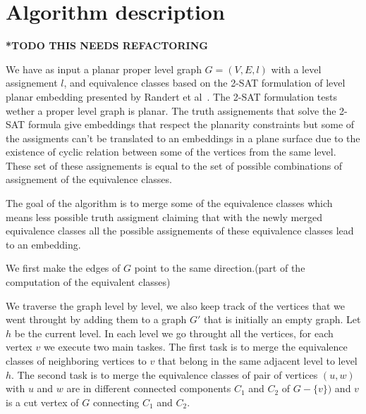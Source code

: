 \section{Algorithm description}%
\label{sub:Algorithm description}
    \textbf{*TODO THIS NEEDS REFACTORING} 


    We have as input a planar proper level graph $G=\left( V,E,l \right) $ with a level assignement
    $l$, and equivalence classes based on the 2-SAT formulation of level planar embedding presented by 
    Randert et al~\cite{randerath2001satisfiability}. The 2-SAT formulation tests wether a proper level graph 
    is planar. The truth assignements that solve the 2-SAT formula give embeddings that respect the planarity constraints 
    but some of the assigments can't be translated to an embeddings in a plane surface due to the existence of cyclic relation between some of the vertices from the same level. 
    These set of these assignements is equal to the set of possible combinations of assignement of the equivalence classes.

    The goal of the algorithm is to merge some of the equivalence classes which means less possible truth assigment claiming that with the newly merged equivalence classes 
    all the possible assignements of these equivalence classes lead to an embedding. 

    We first make the edges of $G$ point to the same direction.(part of the computation of the equivalent classes)

    We traverse the graph level by level, we also keep track of the vertices that we went throught by adding them to a graph $G'$ that is initially an empty graph. 
    Let $h$ be the current level. In each level we go throught all the vertices, for each vertex $v$ we execute two main taskes. The first task is to 
    merge the equivalence classes of neighboring vertices to $v$ that belong in the same adjacent level to level $h$. %
    The second task is to merge the equivalence classes of pair of vertices $(u,w)$ with $u$ and $w$ 
    are in different connected components $C_1$ and $C_2$ of $G-\{v\})$ and $v$ is a cut vertex of $G$ connecting $C_1$ and $C_2$. 

